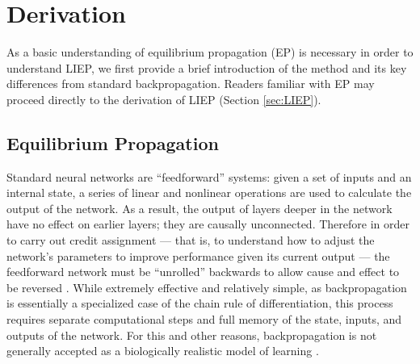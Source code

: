 \section{Derivation}

As a basic understanding of equilibrium propagation (EP) is necessary in order to understand LIEP, we first provide a brief introduction of the method and its key differences from standard backpropagation. Readers familiar with EP may proceed directly to the derivation of LIEP (Section \ref{sec:LIEP}).

\subsection{Equilibrium Propagation}

Standard neural networks are ``feedforward'' systems: given a set of inputs and an internal state, a series of linear and nonlinear operations are used to calculate the output of the network. As a result, the output of layers deeper in the network have no effect on earlier layers; they are causally unconnected. Therefore in order to carry out credit assignment --- that is, to understand how to adjust the network's parameters to improve performance given its current output --- the feedforward network must be ``unrolled'' backwards to allow cause and effect to be reversed \cite{rumelhartLearningRepresentationsBackpropagating1986}. While extremely effective and relatively simple, as backpropagation is essentially a specialized case of the chain rule of differentiation, this process requires separate computational steps and full memory of the state, inputs, and outputs of the network. For this and other reasons, backpropagation is not generally accepted as a biologically realistic model of learning \cite{ororbiaBrainInspiredMachineIntelligence2023, songCanBrainBackpropagation}.

